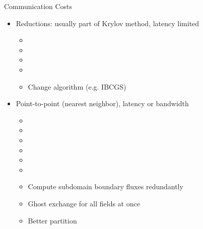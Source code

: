 \begin{frame}{Communication Costs}
  \begin{itemize}
  \item Reductions: usually part of Krylov method, latency limited
    \begin{itemize}
    \item {}
    \item {}
    \item {}
    \item {}
    \item Change algorithm (e.g. IBCGS)
    \end{itemize}
  \item Point-to-point (nearest neighbor), latency or bandwidth
    \begin{itemize}
    \item {}
    \item {}
    \item {}
    \item {}
    \item {}
    \item {}
    \item Compute subdomain boundary fluxes redundantly
    \item Ghost exchange for all fields at once
    \item Better partition
    \end{itemize}
  \end{itemize}
\end{frame}

